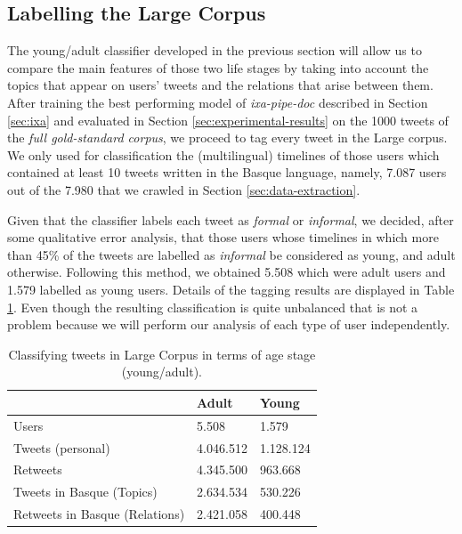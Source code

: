\documentclass[information,article,submit,moreauthors,pdftex,10pt,a4paper]{Definitions/mdpi}
\begin{document}
\subsection{Labelling the Large Corpus}\label{sec:apl}

The young/adult classifier developed in the previous section will allow us to compare the main features of those two life stages by taking into account the topics that appear on users' tweets and the relations that arise between them. After training the best performing model of \emph{ixa-pipe-doc} described in Section \ref{sec:ixa} and evaluated in Section \ref{sec:experimental-results} on the 1000 tweets of the \emph{full gold-standard corpus}, we proceed to tag every tweet in the Large corpus. We only used for classification the (multilingual) timelines of those users which contained at least 10 tweets written in the Basque language, namely, 7.087 users out of the 7.980 that we crawled in Section \ref{sec:data-extraction}.

Given that the classifier labels each tweet as \emph{formal} or \emph{informal}, we decided, after some qualitative error analysis, that those users whose timelines in which more than 45\% of the tweets are labelled as \emph{informal} be considered as young, and adult otherwise. Following this method, we obtained 5.508 which were adult users and 1.579 labelled as young users. Details of the tagging results are displayed in Table \ref{tab:largecorpusdata}. Even though the resulting classification is quite unbalanced that is not a problem because we will perform our analysis of each type of user independently.

\begin{table}[H]
  \centering
  \begin{tabular}{lll} \hline
     & Adult & Young \\ \hline \hline
    Users & 5.508 & 1.579 \\
    Tweets (personal) & 4.046.512 & 1.128.124 \\
    Retweets  & 4.345.500 & 963.668 \\
    Tweets in Basque (Topics) & 2.634.534 & 530.226 \\
    Retweets in Basque (Relations) & 2.421.058 & 400.448 \\ \hline
  \end{tabular}
  \caption{Classifying tweets in Large Corpus in terms of age stage (young/adult).}
  \label{tab:largecorpusdata}
\end{table}
\end{document}
